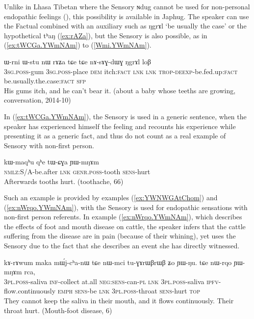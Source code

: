\documentclass[oldfontcommands,oneside,a4paper,11pt]{article}
\newcommand{\ipa}[1]{{\phon \mbox{#1}}} %
\newcommand{\refb}[1]{(\ref{#1})}
\newcommand{\factual}[1]{\textsc{:fact}}
\begin{document}
Unlike in Lhasa Tibetan where the Sensory \ipa{ɴdug} cannot be used for non-personal endopathic feelings (\citealt{tournadre14evidentiality}), this possibility is available in Japhug. The speaker can use the Factual combined with an auxiliary such as \ipa{ŋgrɤl}  `be usually the case' or the hypothetical \ipa{tʰaŋ} (\ref{ex:rAZa}), but the Sensory is also possible, as in \refb{ex:tWCGa.YWmNAm} to \refb{Wmi.YWmNAm}.


\begin{exe}
\ex \label{ex:rAZa}
\gll
\ipa{ɯ-rni}  	\ipa{ɯ-stu}  	\ipa{nɯ}  	\ipa{rɤʑa}  	\ipa{tɕe}  	\ipa{tɕe}  	\ipa{nɤ-sɤɣ-dɯɣ}  	\ipa{ŋgrɤl}  	\ipa{loβ}  \\
\textsc{3sg.poss}-gum \textsc{3sg.poss}-place \textsc{dem} itch\factual{} \textsc{lnk} \textsc{lnk} \textsc{trop-deexp}-be.fed.up\factual{} be.usually.the.case\factual{} \textsc{sfp} \\
\glt His gums itch, and he can't bear it. (about a baby whose teeths are growing, conversation, 2014-10)
\end{exe}

In \refb{ex:tWCGa.YWmNAm}, the Sensory is used in a generic sentence, when the speaker has experienced himself the feeling and recounts his experience while presenting it as a generic fact, and thus do not count as a real example of Sensory with non-first person.

\begin{exe}
\ex \label{ex:tWCGa.YWmNAm}
\gll
\ipa{kɯ-maqʰu}  	\ipa{qʰe}  	\ipa{tɯ-ɕɣa}  	\ipa{ɲɯ-mŋɤm}  \\
\textsc{nmlz}:S/A-be.after \textsc{lnk} \textsc{genr.poss}-tooth \textsc{sens}-hurt \\
\glt Afterwards tooths hurt. (toothache, 66)
\end{exe}

Such an example is provided by examples \refb{ex:YWNWGAtChom} and \refb{ex:nWrqo.YWmNAm},  with the Sensory is used for endopathic sensations with non-first person referents. In example \refb{ex:nWrqo.YWmNAm}, which describes the effects of foot and mouth disease on cattle, the speaker  infers that the cattle suffering from the disease are in pain (because of their whining), yet uses the Sensory due to the fact that she describes an event she has directly witnessed. 

\begin{exe}
\ex \label{ex:nWrqo.YWmNAm}
\gll \ipa{nɯ-mci} 	\ipa{kɤ-rɤwum} 	\ipa{maka} 	\ipa{mɯ́j-cʰa-nɯ} 	\ipa{tɕe} 	\ipa{nɯ-mci} 	\ipa{tu-ɣɤrɯβrɯβ} 	\ipa{ʑo} 	\ipa{ɲɯ-ŋu.}  
\ipa{tɕe} 	\ipa{nɯ-rqo} 	\ipa{ɲɯ-mŋɤm} 	\ipa{rca,} \\
\textsc{3pl.poss}-saliva \textsc{inf}-collect at.all \textsc{neg:sens}-can-\textsc{pl} \textsc{lnk} \textsc{3pl.poss}-saliva \textsc{ipfv}-flow.continuously \textsc{emph} \textsc{sens}-be \textsc{lnk} \textsc{3pl.poss}-throat \textsc{sens}-hurt \textsc{top}  \\
\glt They cannot keep the saliva in their mouth, and it flows continuously. Their throat hurt. (Mouth-foot disease, 6)
\end{exe}
\end{document}
